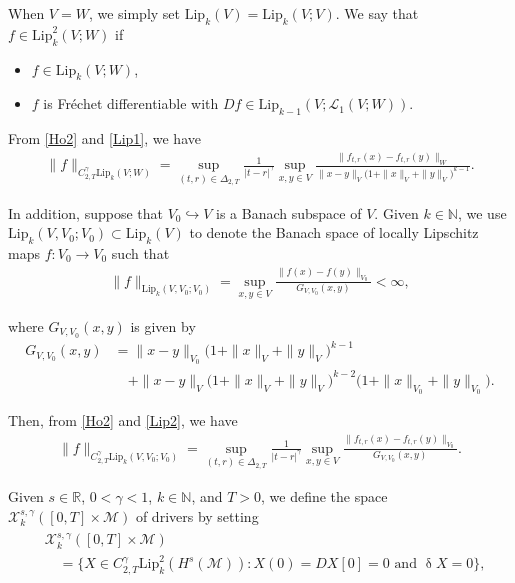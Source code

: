 \documentclass[letterpaper, 11pt,  reqno]{amsart}
\newcommand{\1}{\hspace{0.5mm}\text{I}\hspace{0.5mm}}
\newcommand{\noi}{\noindent}
\newcommand{\R}{\mathbb{R}}
\newcommand{\updl}{\updelta}
\newcommand{\Dl}{\Delta}
\newcommand{\g}{\gamma}
\newcommand{\M}{\mathcal{M}}
\newcommand{\N}{\mathbb{N}}
\newcommand{\cL}{\mathcal{L}}
\newcommand{\cX}{\mathcal{X}}
\newcommand{\Lip}{\mathrm{Lip}}
\numberwithin{equation}{section}
\numberwithin{theorem}{section}
\begin{document}
\noi
When $V = W$, 
we simply set $\Lip_k(V)= \Lip_k(V;V)$.
We say that $f\in\Lip^2_k(V; W)$ 
if 
\smallskip

\begin{itemize}
\item[(i)] $f\in\Lip_k(V; W)$, 


\smallskip
\item[(ii)]
 $f$ is Fr\'echet differentiable 
with 
$Df \in \Lip_{k-1}(V;\cL_1(V; W))$.


\end{itemize}





\smallskip

\noi
From \eqref{Ho2} and \eqref{Lip1}, we have 
\begin{align}
\|f \|_{C^\g_{2, T}\Lip_k(V;W)}
= \sup_{(t,r) \in \Dl_{2,T}}
\frac 1{|t-r|^{\g}}
\sup_{x,y\in V} 
\frac{\| f_{t, r}(x)- f_{t, r}(y)\|_W}{\|x-y\|_V \big(1+\|x\|_V+\|y\|_V\big)^{k-1}}.
\label{Ho3}
\end{align}


\noi
In addition, suppose that $V_0 \hookrightarrow V$
is a Banach subspace of $V$.
Given $k \in \N$, 
we  use $\Lip_k(V, V_0; V_0)\subset  \Lip_k(V)$ 
to denote the Banach space of 
locally Lipschitz maps $f:V_0\to V_0$
such that 
\begin{align}
\|f\|_{\Lip_k(V, V_0; V_0)}
= 
\sup_{x,y\in V} 
\frac{\|f(x)-f(y)\|_{V_0}}
{G_{V, V_0}(x, y)}
<\infty , 
\label{Lip2}
\end{align}

\noi
where $G_{V, V_0}(x, y)$ is given by 
\begin{align*}
G_{V, V_0}(x, y)
& = \|x-y\|_{V_0} \big(1+\|x\|_{V}+\|y\|_{V}\big)^{k-1}\\
& \quad + \|x-y\|_{V} \big(1+\|x\|_{V}+\|y\|_{V}\big)^{k-2}
 \big(1+\|x\|_{V_0}+\|y\|_{V_0}\big).
\end{align*}

\noi
Then, 
from \eqref{Ho2} and \eqref{Lip2}, we have 
\begin{align}
\|f \|_{C^\g_{2, T}\Lip_k(V, V_0; V_0)}
= \sup_{(t,r) \in \Dl_{2,T}}
\frac 1{|t-r|^{\g}}
\sup_{x,y\in V} 
\frac{\| f_{t, r}(x)- f_{t, r}(y)\|_{V_0}}{
G_{V, V_0}(x, y)}.
\label{Ho4}
\end{align}








\medskip

Given $s \in \R$, $0 < \g < 1$,  $k \in \N$, and $T > 0$, 
we define the space 
$\cX^{s, \g}_k([0, T]\times\M)$ of drivers by setting
\begin{align}
\begin{split}
& \cX^{s, \g}_k ([0, T]\times \M) \\
& \quad = 
\big\{X \in C^\g_{2, T} \Lip_k^2(H^s(\M)):
X(0) = DX[0]= 0 \text{ and }\updl X = 0\big\}, 
\end{split}
\label{X1}
\end{align}
\end{document}
